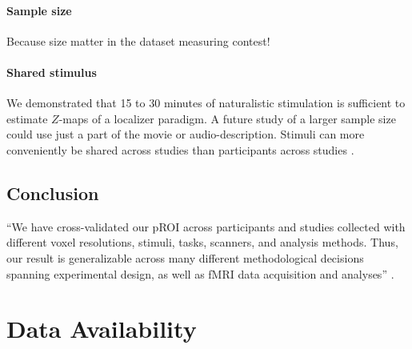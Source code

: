 \paragraph{Sample size}



Because size matter in the dataset measuring contest!



\paragraph{Shared stimulus}

%
We demonstrated that 15 to 30 minutes of naturalistic stimulation is sufficient
to estimate $Z$-maps of a localizer paradigm.
%
A future study of a larger sample size could use just a part of the movie or
audio-description.
%
Stimuli can more conveniently be shared across studies than participants across
studies \citep[cf.][an extension of the \ac{srm} for shared subjects across
datasets]{zhang2018transfer}.







\subsection{Conclusion}

``We have cross-validated our pROI across participants and studies collected
with different voxel resolutions, stimuli, tasks, scanners, and analysis
methods.
%
Thus, our result is generalizable across many different methodological decisions
spanning experimental design, as well as fMRI data acquisition and analyses''
\citep{weiner2018defining}.


\section{Data Availability}



